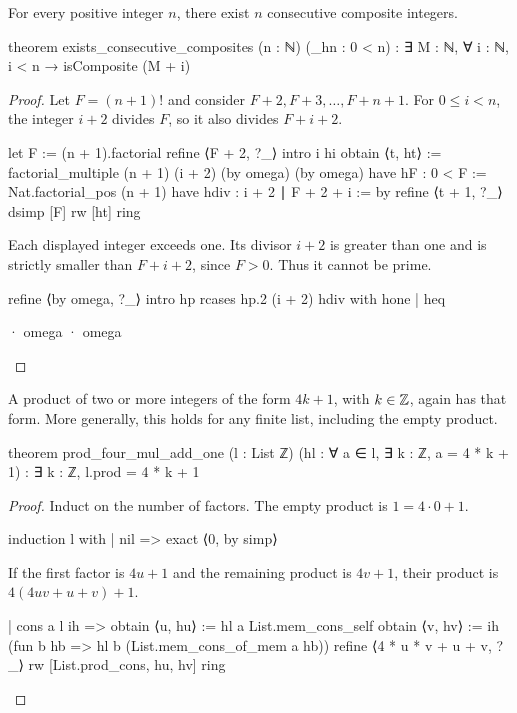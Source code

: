 \begin{theorem}
  \label{ent:thm:consecutive-composites}
  For every positive integer $n$, there exist $n$ consecutive composite integers.

  \begin{lean}
    theorem exists_consecutive_composites (n : ℕ) (_hn : 0 < n) :
        ∃ M : ℕ, ∀ i : ℕ, i < n → isComposite (M + i)
  \end{lean}
\end{theorem}

\begin{proof}
  Let $F=(n+1)!
  $ and consider $F+2,F+3,\ldots,F+n+1$.
  For $0\le i<n$, the integer $i+2$ divides $F$, so it also divides $F+i+2$.

  \begin{lean}
    let F := (n + 1).factorial
    refine ⟨F + 2, ?_⟩
    intro i hi
    obtain ⟨t, ht⟩ := factorial_multiple (n + 1) (i + 2) (by omega) (by omega)
    have hF : 0 < F := Nat.factorial_pos (n + 1)
    have hdiv : i + 2 ∣ F + 2 + i := by
      refine ⟨t + 1, ?_⟩
      dsimp [F]
      rw [ht]
      ring
  \end{lean}

  Each displayed integer exceeds one.
  Its divisor $i+2$ is greater than one and is strictly smaller than $F+i+2$, since $F>0$.
  Thus it cannot be prime.

  \begin{lean}
    refine ⟨by omega, ?_⟩
    intro hp
    rcases hp.2 (i + 2) hdiv with hone | heq

    · omega
    · omega
  \end{lean}

\end{proof}

\begin{lemma}
  \label{ent:lem:product-four-mul-add-one}
  A product of two or more integers of the form $4k+1$, with $k\in\mathbb{Z}$, again has that form.
  More generally, this holds for any finite list, including the empty product.

  \begin{lean}
    theorem prod_four_mul_add_one (l : List ℤ)
        (hl : ∀ a ∈ l, ∃ k : ℤ, a = 4 * k + 1) :
        ∃ k : ℤ, l.prod = 4 * k + 1
  \end{lean}
\end{lemma}

\begin{proof}
  Induct on the number of factors.
  The empty product is $1=4\cdot0+1$.

  \begin{lean}
    induction l with
    | nil => exact ⟨0, by simp⟩
  \end{lean}

  If the first factor is $4u+1$ and the remaining product is $4v+1$, their product is
  $4(4uv+u+v)+1$.

  \begin{lean}
    | cons a l ih =>
      obtain ⟨u, hu⟩ := hl a List.mem_cons_self
      obtain ⟨v, hv⟩ := ih (fun b hb => hl b (List.mem_cons_of_mem a hb))
      refine ⟨4 * u * v + u + v, ?_⟩
      rw [List.prod_cons, hu, hv]
      ring
  \end{lean}
\end{proof}

